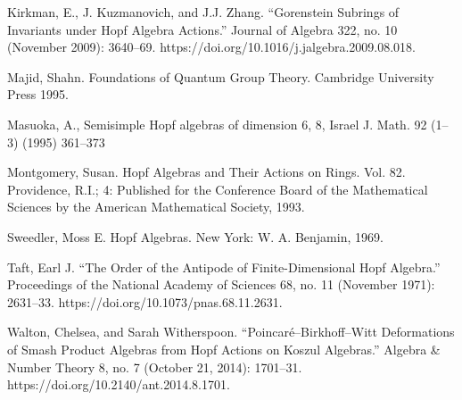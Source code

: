 \documentclass[12pt,a4paper]{article}
\newcommand\1{_{(1)}}
\newcommand\2{_{(2)}}
\begin{document}
\begin{thebibliography}{99}
Kirkman, E., J. Kuzmanovich, and J.J. Zhang. “Gorenstein Subrings of Invariants under Hopf Algebra Actions.” Journal of Algebra 322, no. 10 (November 2009): 3640–69. https://doi.org/10.1016/j.jalgebra.2009.08.018.

Majid, Shahn. Foundations of Quantum Group Theory. Cambridge University Press 1995.

Masuoka, A., Semisimple Hopf algebras of dimension 6, 8, Israel J. Math. 92 (1–3) (1995) 361–373

Montgomery, Susan. Hopf Algebras and Their Actions on Rings. Vol. 82. Providence, R.I.; 4: Published for the Conference Board of the Mathematical Sciences by the American Mathematical Society, 1993.

Sweedler, Moss E. Hopf Algebras. New York: W. A. Benjamin, 1969.

Taft, Earl J. “The Order of the Antipode of Finite-Dimensional Hopf Algebra.” Proceedings of the National Academy of Sciences 68, no. 11 (November 1971): 2631–33. https://doi.org/10.1073/pnas.68.11.2631.

Walton, Chelsea, and Sarah Witherspoon. “Poincaré–Birkhoff–Witt Deformations of Smash Product Algebras from Hopf Actions on Koszul Algebras.” Algebra \& Number Theory 8, no. 7 (October 21, 2014): 1701–31. https://doi.org/10.2140/ant.2014.8.1701.
\end{thebibliography}
\end{document}
